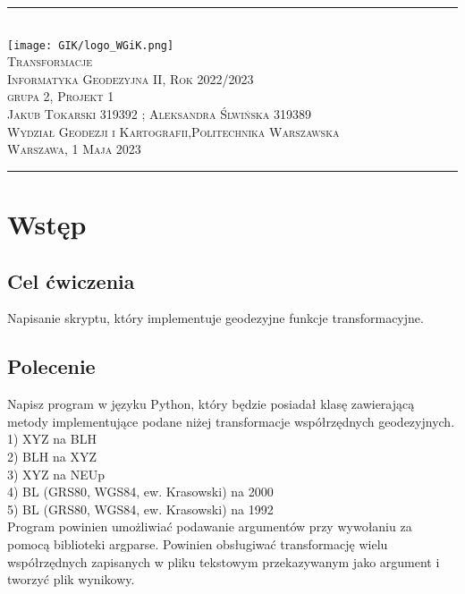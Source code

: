 \documentclass[a4paper, 12p] {article}
\begin{document}
\begin{center} 
\rule{\textwidth}{1.0pt} \\
\vspace{0.5cm}
    \texttt{[image: GIK/logo\_WGiK.png]}
\vspace{0.2cm} \\
	\huge \textsc{Transformacje}
\vspace{1.0cm} \\  
	\Large \textsc{Informatyka Geodezyjna II, Rok 2022/2023 \\ grupa 2, Projekt 1}
\vspace{0.4cm}\\
	\textsc{Jakub Tokarski 319392 ; Aleksandra Ślwińska 319389} 
\vspace{0.3cm}\\
	\textsc{Wydział Geodezji i Kartografii,Politechnika Warszawska} \\
        \textsc{Warszawa, 1 Maja 2023}
\end{center} 
\rule{\textwidth}{1.0pt}

\newpage   
\section{Wstęp}
\subsection{Cel ćwiczenia}
Napisanie skryptu, który implementuje geodezyjne funkcje transformacyjne. 

\subsection{Polecenie}
Napisz program w języku Python, który będzie posiadał klasę zawierającą metody implementujące podane niżej transformacje współrzędnych geodezyjnych. \\
1) XYZ na BLH \\
2) BLH na XYZ \\
3) XYZ na NEUp \\ 
4) BL (GRS80, WGS84, ew. Krasowski) na 2000 \\
5) BL (GRS80, WGS84, ew. Krasowski) na 1992 \\

Program powinien umożliwiać podawanie argumentów przy wywołaniu za pomocą biblioteki argparse. Powinien obsługiwać transformację wielu współrzędnych zapisanych w pliku tekstowym przekazywanym jako argument i tworzyć plik wynikowy.
\end{document}
